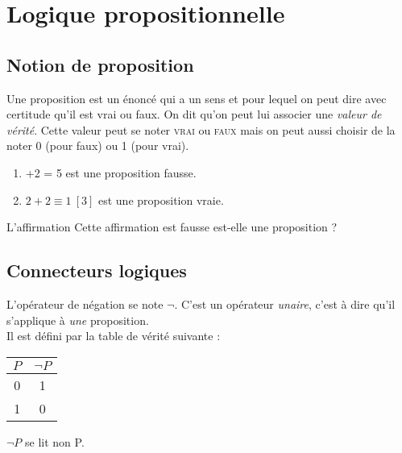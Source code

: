 \documentclass[a4paper,12pt,french]{book}
\begin{document}
	\chapter{Logique propositionnelle}
	\section{Notion de proposition}
	\begin{definition}[ : proposition]
		Une proposition est un énoncé qui a un sens et pour lequel on peut dire avec certitude qu'il est vrai ou faux. On dit qu'on peut lui associer une \textit{valeur de vérité}. Cette valeur peut se noter \textsc{vrai} ou \textsc{faux} mais on peut aussi choisir de la noter 0 (pour faux) ou 1 (pour vrai).
	\end{definition}
 
	\begin{exemple}[s]
		\begin{enumerate}[\textbullet]
			\item 	{}+2 = 5\fg{} est une proposition fausse.
			\item 	\og $2+2\equiv 1\ [3]$\fg{} est une proposition vraie.
		\end{enumerate}
	\end{exemple}

	\begin{exercice}[]
		L'affirmation \og Cette affirmation est fausse\fg{} est-elle une proposition ?
	\end{exercice}
	\section{Connecteurs logiques}
	\begin{definition}
		L'opérateur de négation se note $\neg$. C'est un opérateur \textit{unaire}, c'est à dire qu'il s'applique à \textit{une} proposition.\\
		Il est défini par la table de vérité suivante : 
		\begin{center}
		\begin{tabular}{|c|c|}
			\hline
			\rowcolor{lightgray}
			$P$ & $\neg P$ \\ 
			\hline 
			\rowcolor{white}
			0 & 1 \\ 
			\hline
			\rowcolor{white}
			1 & 0 \\
			\hline 
		\end{tabular} 
		\end{center}
		$\neg P$ se lit \og non P\fg{}.
	\end{definition}
\end{document}
